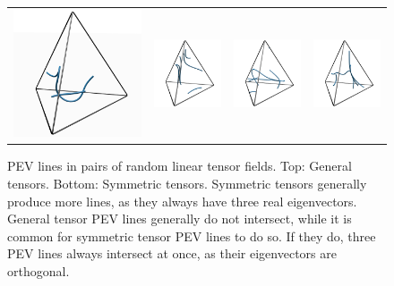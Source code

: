 \begin{figure}[tb]
\begin{tabular}{cccc}
        \includegraphics[width=0.45\columnwidth]{figures/Rand_symm_1.png} &
        \includegraphics[width=0.45\columnwidth]{figures/Rand_symm_2.png} &
        \includegraphics[width=0.45\columnwidth]{figures/Rand_symm_3.png} &
        \includegraphics[width=0.45\columnwidth]{figures/Rand_symm_4.png}
    \end{tabular}
    \caption{PEV lines in pairs of random linear tensor fields. Top: General
             tensors. Bottom: Symmetric tensors. Symmetric tensors generally
             produce more lines, as they always have three real eigenvectors.
             General tensor PEV lines generally do not intersect, while it is
             common for symmetric tensor PEV lines to do so. If they do,
             three PEV lines always intersect at once, as their eigenvectors
             are orthogonal.}
    \label{fig:rand_lines}
\end{figure}
%
